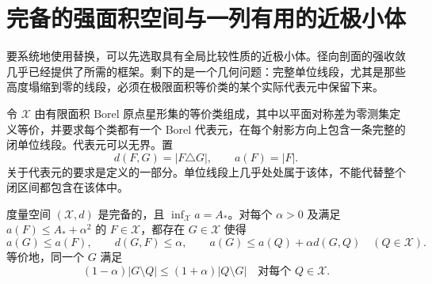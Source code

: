 \section{完备的强面积空间与一列有用的近极小体}\label{sec:strong-metric}
要系统地使用替换，可以先选取具有全局比较性质的近极小体。径向剖面的强收敛几乎已经提供了所需的框架。剩下的是一个几何问题：完整单位线段，尤其是那些高度塌缩到零的线段，必须在极限面积等价类的某个实际代表元中保留下来。

令 $\mathcal X$ 由有限面积 Borel 原点星形集的等价类组成，其中以平面对称差为零测集定义等价，并要求每个类都有一个 Borel 代表元，在每个射影方向上包含一条完整的闭单位线段。代表元可以无界。置
\[
 d(F,G)=|F\triangle G|,\qquad a(F)=|F|.
\]
关于代表元的要求是定义的一部分。单位线段上几乎处处属于该体，不能代替整个闭区间都包含在该体中。

\begin{theorem}[强面积闭性与不受限制的交换]\label{thm:strong-exchange}
度量空间 $(\mathcal X,d)$ 是完备的，且 $\inf_{\mathcal X}a=A_*$。对每个 $\alpha>0$ 及满足 $a(F)\le A_*+\alpha^2$ 的 $F\in\mathcal X$，都存在 $G\in\mathcal X$ 使得
\[
 a(G)\le a(F),\qquad d(G,F)\le\alpha,
 \qquad a(G)\le a(Q)+\alpha d(G,Q)\quad(Q\in\mathcal X).
\]
等价地，同一个 $G$ 满足
\begin{equation}\label{eq:relative-exchange}
 (1-\alpha)|G\setminus Q|\le(1+\alpha)|Q\setminus G|
 \quad\text{对每个 }Q\in\mathcal X.
\end{equation}
\end{theorem}

